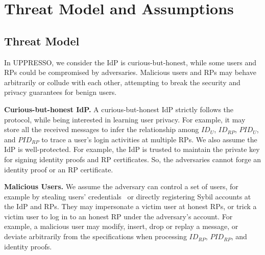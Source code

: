 \section{Threat Model and Assumptions}
\label{sec:assumptionandthreatmodel}


\subsection{Threat Model}
In UPPRESSO, we consider the IdP is curious-but-honest, while some users and RPs could be compromised by adversaries. %
Malicious users and RPs may behave arbitrarily or collude with each other, attempting to break the security and privacy guarantees for benign users.

\noindent \textbf{Curious-but-honest IdP.}
A curious-but-honest IdP strictly follows the protocol, while being interested in learning user privacy.  %
For example, it may store all the received messages to infer the relationship among $ID_U$, $ID_{RP}$, $PID_{U}$, and $PID_{RP}$ to trace a user's login activities at multiple RPs. We also assume the IdP is well-protected. %
For example, the IdP is trusted to maintain the private key for signing identity proofs and RP certificates. %
So, the adversaries cannot forge an identity proof or an RP certificate.



\noindent \textbf{Malicious Users.}
We assume the adversary can control a set of users, for example by stealing users' credentials~\cite{WangZWYH16, SunCL12} or directly registering Sybil accounts at the IdP and RPs.
They may impersonate a victim user at honest RPs, or trick a victim user to log in to an honest RP under the adversary's account.
For example, a malicious user may %
modify, insert, drop or replay a message, or deviate arbitrarily from the specifications when processing $ID_{RP}$, $PID_{RP}$, and identity proofs.


